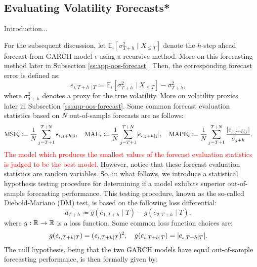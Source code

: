 \newpage
\subsection{Evaluating Volatility Forecasts*}\label{ss:evf-dm}
Introduction...

For the subsequent discussion, let $\mathbb{E}_{\iota}[\sigma_{T+h}^{2}\mid X_{\leq T}]$ denote the $h$-step ahead forecast from GARCH model $\iota$ using a recursive method. More on this forecasting method later in Subsection \ref{ss:app-oos-forecast}. Then, the corresponding forecast error is defined as:
\begin{equation}\label{eq:forecasterror}
    e_{\iota,T+h\mid T}\coloneqq\mathbb{E}_{\iota}[\sigma_{T+h}^{2}\mid X_{\leq T}]-\sigma_{T+h}^{2},
\end{equation}
where $\sigma_{T+h}^{2}$ denotes a proxy for the true volatility. More on volatility proxies later in Subsection \ref{ss:app-oos-forecast}.
Some common forecast evaluation statistics based on $N$ out-of-sample forecasts are as follows:
\begin{equation*}
    \mathrm{MSE}_{\iota}\coloneqq\frac{1}{N}\sum_{j=T+1}^{T+N}e_{\iota,j+h\mid j},\quad\mathrm{MAE}_{\iota}\coloneqq\frac{1}{N}\sum_{j=T+1}^{T+N}\lvert e_{\iota,j+h\mid j}\rvert,\quad\mathrm{MAPE}_{\iota}\coloneqq\frac{1}{N}\sum_{j=T+1}^{T+N}\frac{\lvert e_{\iota,j+h\mid j}\rvert}{\sigma_{j+h}}.
\end{equation*}
\textcolor{red}{The model which produces the smallest values of the forecast evaluation statistics is judged to be the best model}. However, notice that these forecast evaluation statistics are random variables. So, in what follows, we introduce a statistical hypothesis testing procedure for determining if a model exhibits superior out-of-sample forecasting performance. This testing procedure, known as the so-called Diebold-Mariano (DM) test, is based on the following loss differential:
\begin{equation*}
    d_{T+h}\coloneqq g(e_{1,T+h}\mid T)-g(e_{2,T+h}\mid T),
\end{equation*}
where $g:\mathbb{R}\to\mathbb{R}$ is a loss function. Some common loss function choices are:
\begin{equation*}
    g(e_{\iota,T+h\mid T})=(e_{\iota,T+h\mid T})^{2},\quad g(e_{\iota,T+h\mid T})=\lvert e_{\iota,T+h\mid T}\rvert.
\end{equation*}
The null hypothesis, being that the two GARCH models have equal out-of-sample forecasting performance, is then formally given by: 
